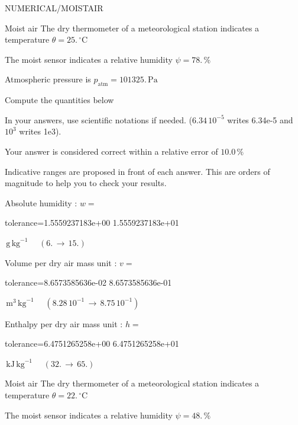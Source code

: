\documentclass[12pt]{article}
\begin{document}
\begin{quiz}{NUMERICAL/MOISTAIR} 

 \begin{cloze}{Moist air} 
The dry thermometer of a meteorological station indicates a temperature $\theta = 25.\,  \mathrm{^\circ\mathrm{C}} $

The moist sensor indicates a relative humidity $\psi = 78.\, \% $

Atmospheric pressure is $p_{\text{atm}} = 101325.\,  \mathrm{Pa} $

 

Compute the quantities below

In your answers, use scientific notations if needed.  ($6.34\, 10^{-5}$ writes 6.34e-5 and $10^{3}$ writes 1e3).

Your answer is considered correct within a relative error of $10.0\, \% $

Indicative ranges are proposed in front of each answer. This are orders of magnitude to help you to check your results.

Absolute humidity : $w =  $
\begin{numerical}[points=1] 
\item[tolerance={1.5559237183e+00}] 1.5559237183e+01 
\end{numerical} 
 $\,  \mathrm{g}\,  \mathrm{kg}^{-1}$ 
 $ \quad (6. \, \rightarrow \, 15.) $ 

Volume per dry air mass unit : $v =  $
\begin{numerical}[points=1] 
\item[tolerance={8.6573585636e-02}] 8.6573585636e-01 
\end{numerical} 
 $\,  \mathrm{m}^{3}\,  \mathrm{kg}^{-1}$ 
 $ \quad ( 8.28 \, 10^{-1}  \, \rightarrow \,  8.75 \, 10^{-1} ) $ 

Enthalpy per dry air mass unit : $h =  $
\begin{numerical}[points=2] 
\item[tolerance={6.4751265258e+00}] 6.4751265258e+01 
\end{numerical} 
 $\,  \mathrm{kJ}\,  \mathrm{kg}^{-1}$ 
 $ \quad (32. \, \rightarrow \, 65.) $ 

\end{cloze} 


 \begin{cloze}{Moist air} 
The dry thermometer of a meteorological station indicates a temperature $\theta = 22.\,  \mathrm{^\circ\mathrm{C}} $

The moist sensor indicates a relative humidity $\psi = 48.\, \% $


\end{cloze}
\end{quiz}
\end{document}
